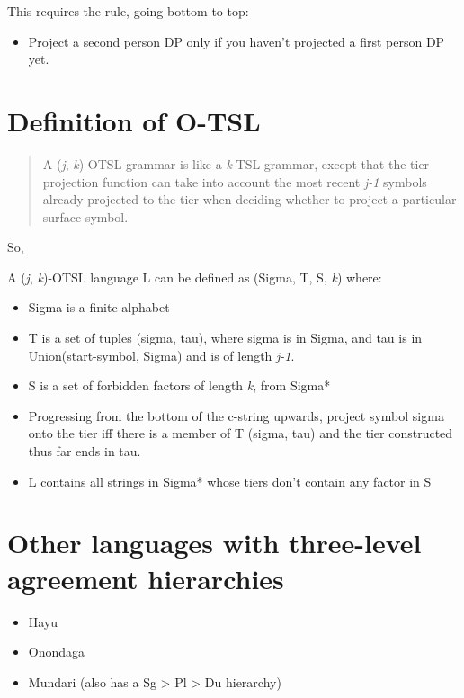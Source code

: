 This requires the rule, going bottom-to-top:

\begin{itemize}
  \item Project a second person DP only if you haven't projected a first person DP yet.
\end{itemize}

\section*{Definition of O-TSL}

\begin{quote}
A (\textit{j}, \textit{k})-OTSL grammar is like a \textit{k}-TSL grammar, except that the tier projection function can take into account the most recent \textit{j-1} symbols already projected to the tier when deciding whether to project a particular surface symbol.

\end{quote}

So,

A (\textit{j}, \textit{k})-OTSL language L can be defined as (Sigma, T, S, \textit{k}) where:

\begin{itemize}
  \item Sigma is a finite alphabet
  \item T is a set of tuples (sigma, tau), where sigma is in Sigma, and tau is in Union(start-symbol, Sigma) and is of length \textit{j-1}.
  \item S is a set of forbidden factors of length \textit{k}, from Sigma*
  \item Progressing from the bottom of the c-string upwards, project symbol sigma onto the tier iff there is a member of T (sigma, tau) and the tier constructed thus far ends in tau.
  \item L contains all strings in Sigma* whose tiers don't contain any factor in S
\end{itemize}

\section*{Other languages with three-level agreement hierarchies}

\begin{itemize}
  \item Hayu
  \item Onondaga
  \item Mundari (also has a Sg > Pl > Du hierarchy)
\end{itemize}

